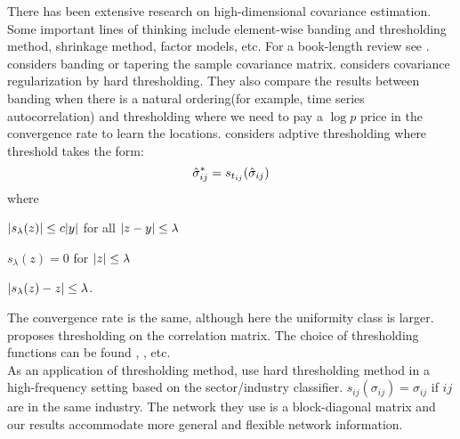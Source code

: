     There has been extensive research on high-dimensional covariance estimation. Some important lines of thinking include element-wise banding and thresholding method, shrinkage method, factor models, etc. For a book-length review see \cite{pourahmadi2013HighdimensionalCovariance}.\\
    
    \cite{bickel2008CovarianceRegularization} considers banding or tapering the sample covariance matrix. \cite{bickel2008CovarianceRegularization} considers covariance regularization by hard thresholding. They also compare the results between banding when there is a natural ordering(for example, time series autocorrelation) and thresholding where we need to pay a \(\log p\)  price in the convergence rate to learn the locations. 
    \cite{cai2011AdaptiveThresholding} considers adptive thresholding where threshold takes the form:
    \begin{equation}
        \hat{\sigma}_{ij}^{*} = s_{t_{ij}}\pqty{\hat{\sigma}_{ij}}
    \end{equation}
    where \begin{enumerate*}
        \item \(\abs{s_{\lambda}(z)} \leq c \abs{y}\) for all \(\abs{z - y}\leq \lambda\)
        \item \(s_{\lambda}(z) = 0\) for \(\abs{z}\leq \lambda\)
        \item \(\abs{s_{\lambda}(z) - z} \leq \lambda\).
    \end{enumerate*}
    The convergence rate is the same, although here the uniformity class is larger. \cite{fan2015OverviewEstimation} proposes thresholding on the correlation matrix. The choice of thresholding functions can be found \cite{rothman2009GeneralizedThresholding}, \cite{fan2001VariableSelection}, etc. \\
    
    As an application of thresholding method, \cite{fan2016IncorporatingGlobal} use hard thresholding method in a high-frequency setting based on the sector/industry classifier. \(s_{ij}(\sigma_{ij})= \sigma_{ij}\) if \(ij\) are in the same industry. The network they use is a block-diagonal matrix and our results accommodate more general and flexible network information. \\

